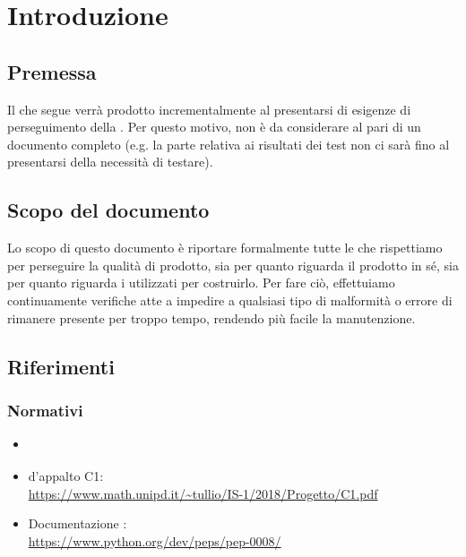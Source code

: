 \section{Introduzione}\label{introduzione}

    

    \subsection{Premessa}
    Il  che segue verrà prodotto incrementalmente al presentarsi di esigenze di perseguimento della .
    Per questo motivo, non è da considerare al pari di un documento completo (e.g. la parte relativa ai risultati dei test non ci sarà fino
    al presentarsi della necessità di testare).

    \subsection{Scopo del documento}
    Lo scopo di questo documento è riportare formalmente tutte le  che rispettiamo per perseguire
    la qualità di prodotto, sia per quanto riguarda il prodotto in s\'e, sia per quanto riguarda i 
    utilizzati per costruirlo. Per fare ciò, effettuiamo continuamente verifiche atte a impedire a qualsiasi tipo di malformità o errore di rimanere presente per troppo tempo, rendendo più facile la manutenzione.

    

    \subsection{Riferimenti}
	
	\subsubsection{Normativi}
    \begin{itemize}
    	\item \textit{\NdPv}
    	\item {} d'appalto C1:\\ \url{https://www.math.unipd.it/~tullio/IS-1/2018/Progetto/C1.pdf}
        
        \item Documentazione :\\
        \url{https://www.python.org/dev/peps/pep-0008/}
    \end{itemize}
    
